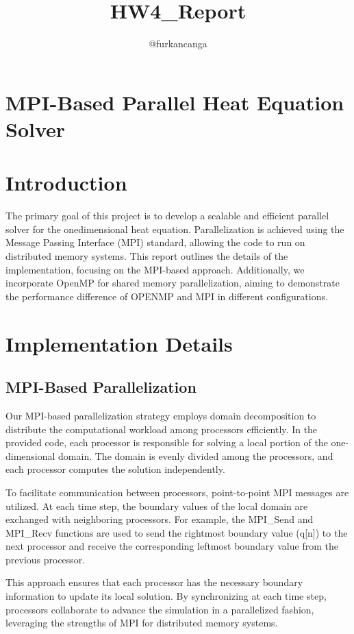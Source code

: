\documentclass[10pt]{article}
\title{HW4\_Report}
\author{@furkancanga}
\date{}
\begin{document}
\maketitle


\section*{MPI-Based Parallel Heat Equation Solver }
\section{Introduction}
The primary goal of this project is to develop a scalable and efficient parallel solver for the onedimensional heat equation. Parallelization is achieved using the Message Passing Interface (MPI) standard, allowing the code to run on distributed memory systems. This report outlines the details of the implementation, focusing on the MPI-based approach. Additionally, we incorporate OpenMP for shared memory parallelization, aiming to demonstrate the performance difference of OPENMP and MPI in different configurations.

\section{Implementation Details}
\subsection{MPI-Based Parallelization}
Our MPI-based parallelization strategy employs domain decomposition to distribute the computational workload among processors efficiently. In the provided code, each processor is responsible for solving a local portion of the one-dimensional domain. The domain is evenly divided among the processors, and each processor computes the solution independently.

To facilitate communication between processors, point-to-point MPI messages are utilized. At each time step, the boundary values of the local domain are exchanged with neighboring processors. For example, the MPI\_Send and MPI\_Recv functions are used to send the rightmost boundary value (q[n]) to the next processor and receive the corresponding leftmost boundary value from the previous processor.

This approach ensures that each processor has the necessary boundary information to update its local solution. By synchronizing at each time step, processors collaborate to advance the simulation in a parallelized fashion, leveraging the strengths of MPI for distributed memory systems.
\end{document}

